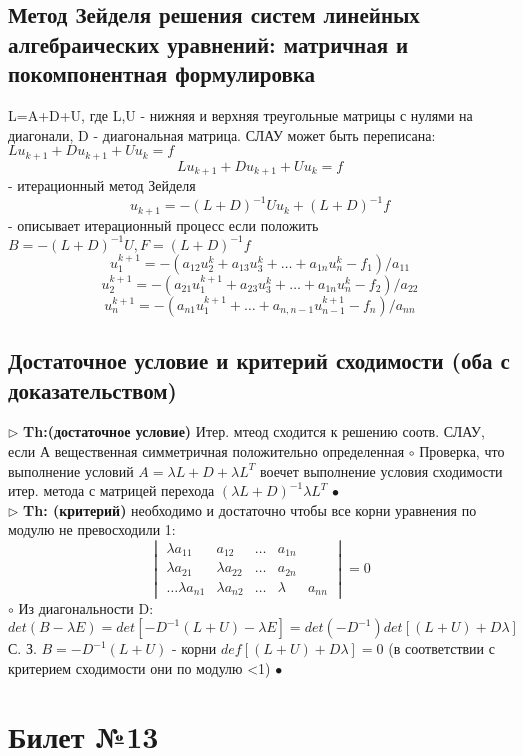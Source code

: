 \documentclass[a4paper]{article}
\begin{document}
\subsection{Метод Зейделя решения систем линейных алгебраических уравнений: матричная и покомпонентная формулировка}
L=A+D+U, где L,U - нижняя и верхняя треугольные матрицы с нулями на диагонали, D - диагональная матрица. СЛАУ может быть переписана:
$Lu_{k+1} + Du_{k+1} + Uu_k = f $
$$ Lu_{k+1} + Du_{k+1} + Uu_k =f$$ - итерационный метод Зейделя
$$ u_{k+1} = -(L+D)^{-1}Uu_k + (L+D)^{-1}f$$ - описывает итерационный процесс если положить $ B=-(L+D)^{-1}U, F=(L+D)^{-1}f$
$$ u_1^{k+1}=-(a_{12}u_2^k + a_{13}u_3^k + \ldots + a_{1n}u_n^k - f_1)/a_{11}$$
$$ u_2^{k+1}=-(a_{21}u_1^{k+1} + a_{23}u_3^k + \ldots + a_{1n}u_n^k - f_2)/a_{22}$$
$$ u_n^{k+1}=-(a_{n1}u_1^{k+1} + \ldots + a_{n,n-1}u_{n-1}^{k+1} - f_n)/a_{nn} $$
\subsection{Достаточное условие и критерий сходимости (оба с доказательством)}
$\triangleright$ \textbf{Th:(достаточное условие)} Итер. мтеод сходится к решению соотв. СЛАУ, если А вещественная симметричная положительно определенная
	$\circ$ 
		Проверка, что выполнение условий $ A = \lambda L + D + \lambda L^{T}$ воечет выполнение условия сходимости итер. метода с матрицей перехода $(\lambda L+D)^{-1}\lambda L^{T}$
	$\bullet$ \\

$\triangleright$ \textbf{Th: (критерий)} необходимо и достаточно чтобы все корни уравнения по модулю не превосходили 1:
$$ \begin{vmatrix} 
\lambda a_{11} & a_{12} & \ldots & a_{1n} \\
\lambda a_{21} & \lambda a_{22} & \ldots & a_{2n} \\
\ldots
\lambda a_{n1} & \lambda a_{n2} & \ldots & \lambda & a_{nn}
\end{vmatrix} = 0 $$
	$\circ$ 
		Из диагональности D:
		$$ det(B-\lambda E) = det[-D^{-1}(L+U) - \lambda E] = det(-D^{-1}) det[(L+U) + D\lambda] $$
		С. З. $B=-D^{-1}(L+U)$ - корни $def[(L+U)+D\lambda]=0$ (в соответствии с критерием сходимости они по модулю <1)
	$\bullet$

\section{Билет №13}
\end{document}
